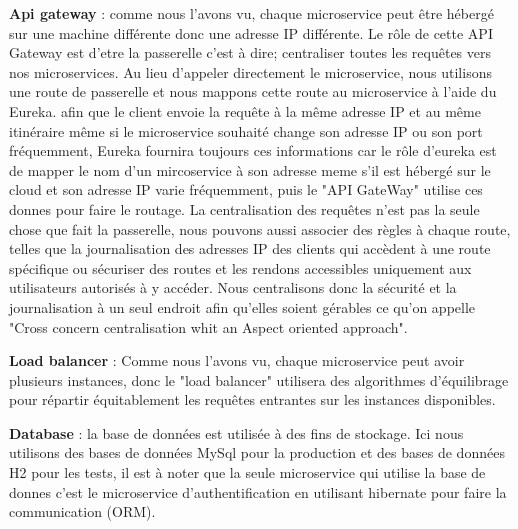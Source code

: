 \begin{figure}[h]
\centering
    \centering
    \qquad
\end{figure}


\textbf{Api gateway} : comme nous l'avons vu, chaque microservice peut être hébergé sur une machine différente donc une adresse IP différente. Le rôle de cette API Gateway est d'etre la passerelle c'est à dire; centraliser toutes les requêtes vers nos microservices. Au lieu d'appeler directement le microservice, nous utilisons une route de passerelle et nous mappons cette route au microservice à l'aide du Eureka. afin que le client envoie la requête à la même adresse IP et au même itinéraire même si le microservice souhaité change son adresse IP ou son port fréquemment, Eureka fournira toujours ces informations car le rôle d'eureka est de mapper le nom d'un mircoservice à son adresse meme s'il est hébergé sur le cloud et son adresse IP varie fréquemment, puis le "API GateWay" utilise ces donnes pour faire le routage. La centralisation des requêtes n'est pas la seule chose que fait la passerelle, nous pouvons aussi associer des règles à chaque route, telles que la journalisation des adresses IP des clients qui accèdent à une route spécifique ou sécuriser des routes et les rendons accessibles uniquement aux utilisateurs autorisés à y accéder. Nous centralisons donc la sécurité et la journalisation à un seul endroit afin qu'elles soient gérables ce qu'on appelle "Cross concern centralisation whit an Aspect oriented approach". 

\begin{figure}[h]
\centering
    \centering
    \qquad
\end{figure}

\textbf{Load balancer} : Comme nous l'avons vu, chaque microservice peut avoir plusieurs instances, donc le "load balancer" utilisera des algorithmes d'équilibrage pour répartir équitablement les requêtes entrantes sur les instances disponibles.

\begin{figure}[h]
\centering
    \centering
    \qquad
\end{figure}

 
\textbf{Database} : la base de données est utilisée à des fins de stockage. Ici nous utilisons des bases de données MySql pour la production et des bases de données H2 pour les tests, il est à noter que la seule microservice qui utilise la base de donnes c'est le microservice d'authentification en utilisant hibernate pour faire la communication (ORM).
 
